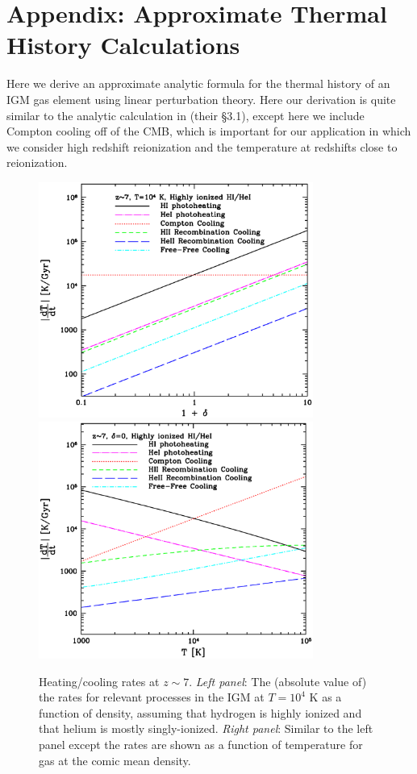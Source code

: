\section*{Appendix: Approximate Thermal History Calculations}


Here we derive an approximate analytic formula for the thermal history of an IGM gas element using
linear perturbation theory. 
Here our derivation is quite similar to the analytic calculation in
\citet{Hui:1997dp} (their \S 3.1), except here we include Compton cooling off of the CMB, which is important for our application in which
we consider high redshift reionization and the temperature at redshifts close to reionization.


\begin{figure}[t]
\includegraphics[width=9cm]{f15a.eps}
\includegraphics[width=9cm]{f15b.eps}
\caption{Heating/cooling rates at $z \sim 7$. {\it Left panel}: The (absolute value of) the rates for relevant processes in the 
IGM at $T=10^4$ K as a function of density,
assuming that hydrogen is highly ionized and that helium is mostly singly-ionized. {\it Right panel}: Similar to the
left panel except the rates are shown as a function of temperature for gas at the comic mean density.}
\label{fig:temp_rates}
\end{figure}

